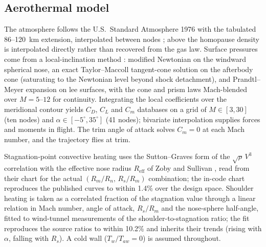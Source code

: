 
\subsection{Aerothermal model}
\label{sec:aero}

The atmosphere follows the U.S.\ Standard Atmosphere 1976 with the tabulated
86--120~km extension, interpolated between nodes \cite{us1976atmosphere};
above the homopause density is interpolated directly rather than recovered
from the gas law. Surface pressures come from a local-inclination method
\cite{dirkx2017entry,hirschel2009}: modified Newtonian on the windward
spherical nose,
an exact Taylor--Maccoll tangent-cone solution on the afterbody cone
(saturating to the Newtonian level beyond shock detachment), and
Prandtl--Meyer expansion on lee surfaces, with the cone and prism laws
Mach-blended over $M=5$--$12$ for continuity. Integrating the local
coefficients over the meridional contour yields $C_D$, $C_L$ and $C_m$
databases on a grid of $M\in[3,30]$ (ten nodes) and
$\alpha\in[-5^\circ,35^\circ]$ (41 nodes); bivariate interpolation supplies
forces and moments in flight. The trim angle of attack solves $C_m=0$ at
each Mach number, and the trajectory flies at trim.

Stagnation-point convective heating uses the Sutton--Graves form of the
$\sqrt{\rho}\,V^3$ correlation \cite{sutton1971}
with the effective nose radius $R_{\mathrm{eff}}$ of Zoby and Sullivan
\cite{zoby1965heating}, read from their chart for the actual
$(R_m/R_n,\,R_s/R_m)$ combination; the in-code chart reproduces the
published curves to within 1.4\% over the design space. Shoulder heating is
taken as a correlated fraction of the stagnation value through a linear
relation in Mach number, angle of attack, $R_s/R_m$ and the nose-sphere
half-angle, fitted to wind-tunnel measurements of the shoulder-to-stagnation
ratio; the fit reproduces the source ratios to within 10.2\% and inherits
their trends (rising with $\alpha$, falling with $R_s$). A cold wall
($T_w/T_{aw}=0$) is assumed throughout.


